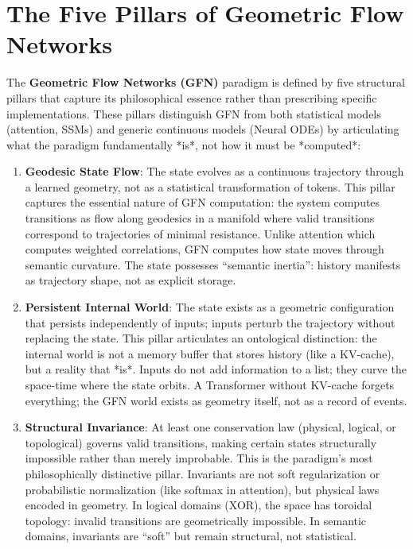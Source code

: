 \documentclass[12pt,a4paper]{article}
\begin{document}
\section{The Five Pillars of Geometric Flow Networks}
\label{sec:architecture}

The \textbf{Geometric Flow Networks (GFN)} paradigm is defined by five structural pillars that capture its philosophical essence rather than prescribing specific implementations. These pillars distinguish GFN from both statistical models (attention, SSMs) and generic continuous models (Neural ODEs) by articulating what the paradigm fundamentally *is*, not how it must be *computed*:

\begin{enumerate}
    \item \textbf{Geodesic State Flow}: The state evolves as a continuous trajectory through a learned geometry, not as a statistical transformation of tokens. This pillar captures the essential nature of GFN computation: the system computes transitions as flow along geodesics in a manifold where valid transitions correspond to trajectories of minimal resistance. Unlike attention which computes weighted correlations, GFN computes how state moves through semantic curvature. The state possesses ``semantic inertia'': history manifests as trajectory shape, not as explicit storage.
    
    \item \textbf{Persistent Internal World}: The state exists as a geometric configuration that persists independently of inputs; inputs perturb the trajectory without replacing the state. This pillar articulates an ontological distinction: the internal world is not a memory buffer that stores history (like a KV-cache), but a reality that *is*. Inputs do not add information to a list; they curve the space-time where the state orbits. A Transformer without KV-cache forgets everything; the GFN world exists as geometry itself, not as a record of events.
    
    \item \textbf{Structural Invariance}: At least one conservation law (physical, logical, or topological) governs valid transitions, making certain states structurally impossible rather than merely improbable. This is the paradigm's most philosophically distinctive pillar. Invariants are not soft regularization or probabilistic normalization (like softmax in attention), but physical laws encoded in geometry. In logical domains (XOR), the space has toroidal topology: invalid transitions are geometrically impossible. In semantic domains, invariants are ``soft'' but remain structural, not statistical.
    

\end{enumerate}
\end{document}
